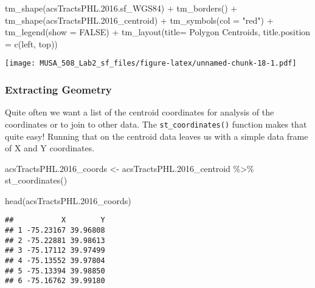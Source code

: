 \documentclass[
]{article}
\newenvironment{Shaded}{\begin{snugshade}}{\end{snugshade}}
\newcommand{\AttributeTok}[1]{\textcolor[rgb]{0.77,0.63,0.00}{#1}}
\newcommand{\ConstantTok}[1]{\textcolor[rgb]{0.00,0.00,0.00}{#1}}
\newcommand{\FloatTok}[1]{\textcolor[rgb]{0.00,0.00,0.81}{#1}}
\newcommand{\FunctionTok}[1]{\textcolor[rgb]{0.00,0.00,0.00}{#1}}
\newcommand{\NormalTok}[1]{#1}
\newcommand{\OtherTok}[1]{\textcolor[rgb]{0.56,0.35,0.01}{#1}}
\newcommand{\SpecialCharTok}[1]{\textcolor[rgb]{0.00,0.00,0.00}{#1}}
\newcommand{\StringTok}[1]{\textcolor[rgb]{0.31,0.60,0.02}{#1}}
\begin{document}
\begin{Shaded}
\begin{Highlighting}[]
\FunctionTok{tm\_shape}\NormalTok{(acsTractsPHL.}\FloatTok{2016.}\NormalTok{sf\_WGS84) }\SpecialCharTok{+}
    \FunctionTok{tm\_borders}\NormalTok{() }\SpecialCharTok{+}
\FunctionTok{tm\_shape}\NormalTok{(acsTractsPHL}\FloatTok{.2016}\NormalTok{\_centroid) }\SpecialCharTok{+}
    \FunctionTok{tm\_symbols}\NormalTok{(}\AttributeTok{col =} \StringTok{"red"}\NormalTok{) }\SpecialCharTok{+}
\FunctionTok{tm\_legend}\NormalTok{(}\AttributeTok{show =} \ConstantTok{FALSE}\NormalTok{) }\SpecialCharTok{+}
   \FunctionTok{tm\_layout}\NormalTok{(}\AttributeTok{title=} \StringTok{\textquotesingle{}Polygon Centroids\textquotesingle{}}\NormalTok{, }
            \AttributeTok{title.position =} \FunctionTok{c}\NormalTok{(}\StringTok{\textquotesingle{}left\textquotesingle{}}\NormalTok{, }\StringTok{\textquotesingle{}top\textquotesingle{}}\NormalTok{))}
\end{Highlighting}
\end{Shaded}

\texttt{[image: MUSA\_508\_Lab2\_sf\_files/figure-latex/unnamed-chunk-18-1.pdf]}

\hypertarget{extracting-geometry}{%
\subsubsection{Extracting Geometry}\label{extracting-geometry}}

Quite often we want a list of the centroid coordinates for analysis of
the coordinates or to join to other data. The \texttt{st\_coordinates()}
function makes that quite easy! Running that on the centroid data leaves
us with a simple data frame of X and Y coordinates.

\begin{Shaded}
\begin{Highlighting}[]
\NormalTok{acsTractsPHL}\FloatTok{.2016}\NormalTok{\_coords }\OtherTok{\textless{}{-}}\NormalTok{ acsTractsPHL}\FloatTok{.2016}\NormalTok{\_centroid }\SpecialCharTok{\%\textgreater{}\%} 
  \FunctionTok{st\_coordinates}\NormalTok{()}

\FunctionTok{head}\NormalTok{(acsTractsPHL}\FloatTok{.2016}\NormalTok{\_coords)}
\end{Highlighting}
\end{Shaded}

\begin{verbatim}
##           X        Y
## 1 -75.23167 39.96808
## 2 -75.22881 39.98613
## 3 -75.17112 39.97499
## 4 -75.13552 39.97804
## 5 -75.13394 39.98850
## 6 -75.16762 39.99180
\end{verbatim}
\end{document}
